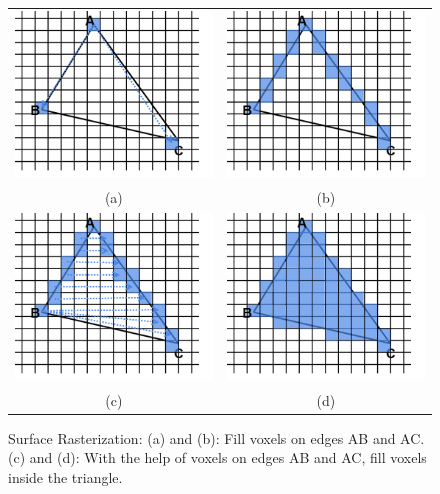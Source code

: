 \begin{figure}
\begin{center}
\begin{tabular}{cc}   %
   \includegraphics[width=0.45\linewidth]{rasterization_fill2vertices} & 
   \includegraphics[width=0.45\linewidth]{rasterization_filledges}  \\
   (a) & (b)\\
   \includegraphics[width=0.45\linewidth]{rasterization_fillsurface} &
   \includegraphics[width=0.45\linewidth]{rasterization_fullfilled}  \\
   (c) & (d)\\
\end{tabular}
\caption{Surface Rasterization: (a) and (b): Fill voxels on edges AB and AC. (c) and (d): With the help of voxels on edges AB and AC, fill voxels inside the triangle.} 
  \label{rasterization}
\end{center}
\end{figure}

